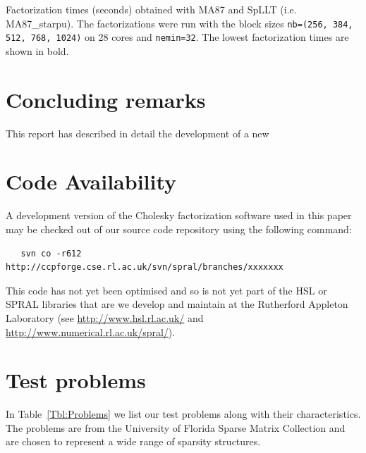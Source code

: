 \documentclass{article}
\begin{document}
\begin{table}[htbp]
    \begin{center}
      
    \end{center}
    \caption{Factorization times (seconds) obtained with MA87 and
      SpLLT (i.e. MA87\_starpu). The factorizations were run with the
      block sizes \texttt{nb=(256, 384, 512, 768, 1024)} on 28 cores
      and \texttt{nemin=32}. The lowest factorization times are shown
      in bold.}
\end{table}

\section{Concluding remarks}\label{sec:conclusions}
This report has described in detail the development of a new

 
\section*{Code Availability}
A development version of the Cholesky factorization software used in this 
paper may be checked out of
our source code repository using the following command:

\begin{verbatim}
   svn co -r612 http://ccpforge.cse.rl.ac.uk/svn/spral/branches/xxxxxxx
\end{verbatim}

This code has not yet been optimised and so is not yet
part of the HSL or SPRAL libraries that are we develop
and maintain at the Rutherford Appleton Laboratory (see
\url{http://www.hsl.rl.ac.uk/} and \url{http://www.numerical.rl.ac.uk/spral/}).

\clearpage


\appendix

\section{Test problems}\label{appendix}
\setcounter{equation}{0}
\setcounter{table}{0}
\setcounter{figure}{0}
\setcounter{table}{0}
\renewcommand{\thetable}{A.\arabic{table}}


In Table~\ref{Tbl:Problems} we list  our test problems along with 
their characteristics. The problems are from the 
University of Florida Sparse Matrix Collection  and are chosen 
to represent a wide range of sparsity structures.
\end{document}
